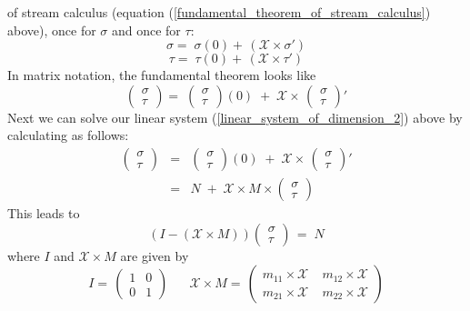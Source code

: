 \documentclass[3p]{elsarticle}
\newcommand{\X}{\mathcal{X}}           %
\newcommand{\streamproduct}{\times} %
\begin{document}
of stream calculus (equation (\ref{fundamental_theorem_of_stream_calculus}) above),
once for $\sigma$  and once for $\tau$:
\[
\sigma = \; \sigma(0) + \, (\X \streamproduct \sigma ')
\]
\[
\tau = \; \tau(0) + \, (\X \streamproduct \tau ')
\]
In matrix notation, the fundamental theorem looks like
\[
\begin{pmatrix}%
\sigma \\ \tau
\end{pmatrix}
= \;
\begin{pmatrix}%
\sigma \\ \tau
\end{pmatrix} (0)
\; + \; \X \streamproduct \,
\begin{pmatrix}%
\sigma \\ \tau
\end{pmatrix} '
\]
Next we can solve our linear system
(\ref{linear_system_of_dimension_2})
above by calculating as follows:
\begin{eqnarray*}
\begin{pmatrix}%
\sigma \\ \tau
\end{pmatrix}
& = &
\begin{pmatrix}%
\sigma \\ \tau
\end{pmatrix} (0)
\; + \; \X \streamproduct \,
\begin{pmatrix}%
\sigma \\ \tau
\end{pmatrix} '
\\
& = & N \; + \; \X \streamproduct M \streamproduct
\begin{pmatrix}%
\sigma \\ \tau
\end{pmatrix}
\end{eqnarray*}
This leads to
\[
(I - (\X \streamproduct M))
\begin{pmatrix}%
\sigma \\ \tau
\end{pmatrix}
\, = \; N
\]
where $I$ and $\X \streamproduct M$ are given by
\[
I = \, \begin{pmatrix}
1 & 0 \\ 0 & 1
\end{pmatrix}
\;\;\;\;\;\; \X \streamproduct M = \,
\begin{pmatrix}
m_{11} \streamproduct \X \; & m_{12} \streamproduct \X \\
m_{21} \streamproduct \X \; & m_{22} \streamproduct \X
\end{pmatrix}
\]
\end{document}

